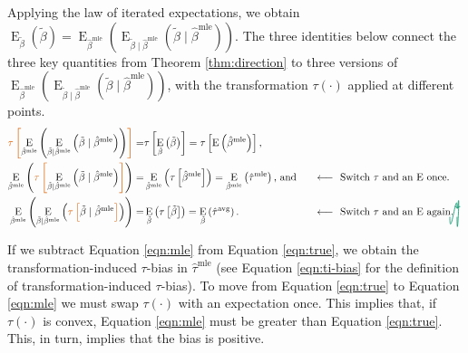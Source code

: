 \documentclass[11pt]{article}
\DeclareMathOperator*{\E}{\text{E}}
\newcommand{\tikzmark}[1]{\tikz[overlay,remember picture] \node (#1) {};}
\newcommand{\DrawBox}[2]{%
  \begin{tikzpicture}[overlay,remember picture]
    \draw[->,shorten >= 6pt, shorten <= 2pt, out=-90, in=85, distance=1.3cm, color2, thick] (MarkA.east) to (MarkB.east);
    \draw[->,shorten >= 6pt, shorten <= 2pt, out=-90, in=90, distance=1cm, color2, thick] (MarkC.west) to (MarkD.east);
  \end{tikzpicture}
}
\newcommand{\justif}[2]{&{#1}&\text{#2}}
\begin{document}
Applying the law of iterated expectations, we obtain $\E_{\tilde{\beta}} \left( \tilde{\beta} \right) = \E_{\hat{\beta}^\text{mle}}\left( \E_{\tilde{\beta} \mid \hat{\beta}^\text{mle}} (\tilde{\beta} \mid \hat{\beta}^\text{mle}) \right)$.
The three identities below connect the three key quantities from Theorem \ref{thm:direction} to three versions of $\E_{\hat{\beta}^\text{mle}}\left( \E_{\tilde{\beta} \mid \hat{\beta}^\text{mle}} (\tilde{\beta} \mid \hat{\beta}^\text{mle}) \right)$, with the transformation $\tau(\cdot)$ applied at different points.
\small
\begin{alignat}{2}
 \color{color1} \tikzmark{MarkA}\tau \left[ \normalcolor \E_{\hat{\beta}^\text{mle}}\left( \E_{\tilde{\beta} \mid \hat{\beta}^\text{mle}} \left( \tilde{\beta} \mid \hat{\beta}^\text{mle} \right) \right) \color{color1} \right] \normalcolor =&  \tau \left[ \E_{\tilde{\beta}} \left( \tilde{\beta} \right) \right] = \tau \left[\E \left( \hat{\beta}^\text{mle} \right) \right]\text{,} \label{eqn:true}\\
 \E_{\hat{\beta}^\text{mle}}\left( \color{color1} \tikzmark{MarkB}\tau\tikzmark{MarkC} \left[ \normalcolor \E_{\tilde{\beta} \mid \hat{\beta}^\text{mle}} \left( \tilde{\beta} \mid \hat{\beta}^\text{mle} \right) \color{color1} \right] \normalcolor \right)  =&  \E_{\hat{\beta}^\text{mle}} \left( \tau \left[\hat{\beta}^\text{mle} \right] \right) =  \E_{\hat{\beta}^\text{mle}} \left(\hat{\tau}^\text{mle} \right) \text{, and} \justif{\quad}{$\longleftarrow~$ Switch $\tau$ and an $\E$ once.} \label{eqn:mle}\\
\E_{\hat{\beta}^\text{mle}}\left( \E_{\tilde{\beta} \mid \hat{\beta}^\text{mle}} \left( \color{color1} \tikzmark{MarkD}\tau \left[ \normalcolor \tilde{\beta} \mid \hat{\beta}^\text{mle} \color{color1} \right] \normalcolor \right) \right)  =&
\E_{\tilde{\beta}} \left( \tau \left[\tilde{\beta} \right] \right)  =
\E_{\tilde{\beta}} \left(\hat{\tau}^\text{avg} \right) \text{.}\justif{\quad}{$\longleftarrow~$ Switch $\tau$ and an $\E$ again.}\label{eqn:avg}\DrawBox{red}{blue}
\end{alignat}
\normalsize

If we subtract Equation \ref{eqn:mle} from Equation \ref{eqn:true}, we obtain the transformation-induced $\tau$-bias in $\hat{\tau}^\text{mle}$ (see Equation \ref{eqn:ti-bias} for the definition of transformation-induced $\tau$-bias).
To move from Equation \ref{eqn:true} to Equation \ref{eqn:mle} we must swap $\tau(\cdot)$ with an expectation once.
This implies that, if $\tau(\cdot)$ is convex, Equation \ref{eqn:mle} must be greater than Equation \ref{eqn:true}.
This, in turn, implies that the bias is positive.
\end{document}
